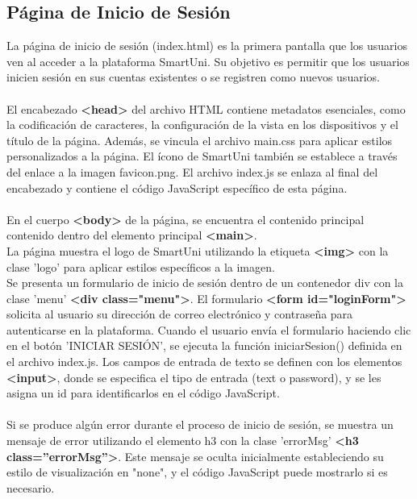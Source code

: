 \documentclass[12pt]{report}
\begin{document}
\subsection{Página de Inicio de Sesión}
La página de inicio de sesión (index.html) es la primera pantalla que los usuarios ven al acceder a la plataforma SmartUni. Su objetivo es permitir que los usuarios inicien sesión en sus cuentas existentes o se registren como nuevos usuarios.\\\\
El encabezado\textbf{ \textless head\textgreater} del archivo HTML contiene metadatos esenciales, como la codificación de caracteres, la configuración de la vista en los dispositivos y el título de la página. Además, se vincula el archivo main.css para aplicar estilos personalizados a la página. El ícono de SmartUni también se establece a través del enlace a la imagen favicon.png. El archivo index.js se enlaza al final del encabezado y contiene el código JavaScript específico de esta página.\\\\
En el cuerpo\textbf{ \textless body\textgreater} de la página, se encuentra el contenido principal contenido dentro del elemento principal \textbf{ \textless main\textgreater}.\\
La página muestra el logo de SmartUni utilizando la etiqueta\textbf{ \textless img\textgreater} con la clase 'logo' para aplicar estilos específicos a la imagen.\\
Se presenta un formulario de inicio de sesión dentro de un contenedor div con la clase 'menu'\textbf{ \textless div class="menu"\textgreater}. El formulario\textbf{ \textless form id="loginForm"\textgreater} solicita al usuario su dirección de correo electrónico y contraseña para autenticarse en la plataforma. Cuando el usuario envía el formulario haciendo clic en el botón 'INICIAR SESIÓN', se ejecuta la función iniciarSesion() definida en el archivo index.js. Los campos de entrada de texto se definen con los elementos\textbf{ \textless input\textgreater}, donde se especifica el tipo de entrada (text o password), y se les asigna un id para identificarlos en el código JavaScript.\\\\
Si se produce algún error durante el proceso de inicio de sesión, se muestra un mensaje de error utilizando el elemento h3 con la clase 'errorMsg'\textbf{ \textless h3 class=''errorMsg''\textgreater}. Este mensaje se oculta inicialmente estableciendo su estilo de visualización en "none", y el código JavaScript puede mostrarlo si es necesario.
\end{document}
